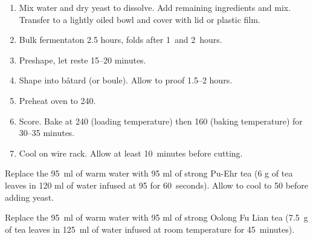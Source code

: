 
\begin{ingredients}
\end{ingredients}


\begin{recipe}
  \begin{enumerate}

  \item Mix water and dry yeast to dissolve.  Add remaining
    ingredients and mix.  Transfer to a lightly oiled bowl and cover
    with lid or plastic film.
    
  \item Bulk fermentaton 2.5 hours, folds after 1~and 2~hours.
    
  \item Preshape, let reste 15--20 minutes.
    
  \item Shape into bâtard (or boule).  Allow to proof 1.5--2 hours.
    
  \item Preheat oven to 240\degreeC.
    
  \item Score.  Bake at 240\degreeC{} (loading temperature) then
    160\degreeC{} (baking temperature) for 30--35 minutes.

  \item Cool on wire rack.  Allow at least 10~minutes before cutting.
    
  \end{enumerate}
\end{recipe}


Replace the 95~ml of warm water with 95 ml of strong Pu-Ehr tea (6 g
of tea leaves in 120 ml of water infused at 95\degreeC{} for
60~seconds).  Allow to cool to 50\degreeC{} before adding yeast.


Replace the 95~ml of warm water with 95 ml of strong Oolong Fu Lian
tea (7.5~g of tea leaves in 125~ml of water infused at room
temperature for 45~minutes).

